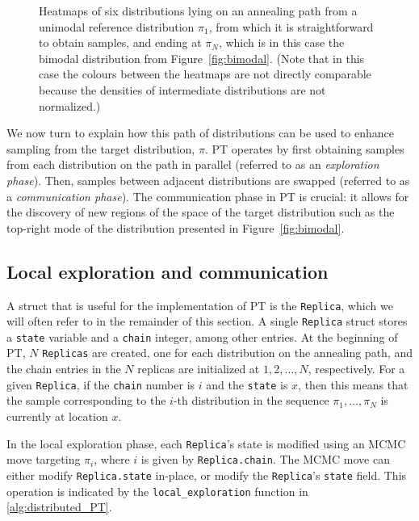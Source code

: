 \begin{figure}[t]
\begin{minipage}{0.15\textwidth}
      \caption*{$\pi_6$}
    \end{minipage}
    \caption{Heatmaps of six distributions lying on an annealing path 
    from a unimodal reference distribution  
    $\pi_1$, from which it is straightforward to obtain samples, and ending at 
    $\pi_N$, which is in this case the bimodal distribution from 
    Figure~\ref{fig:bimodal}. (Note that in this case the colours between the heatmaps 
    are not directly comparable because the densities of intermediate distributions 
    are not normalized.)}
    \label{fig:path}
\end{figure}

We now turn to explain how this path of distributions can be used to enhance 
sampling from the target distribution, $\pi$. 
PT operates by first obtaining samples from each distribution on the path in parallel 
(referred to as an \textit{exploration phase}). 
Then, samples between adjacent distributions are swapped (referred to as 
a \textit{communication phase}). The communication phase in PT is crucial: it allows 
for the discovery of new regions of the space of the target distribution such as 
the top-right mode of the distribution presented in Figure~\ref{fig:bimodal}. 


\subsection{Local exploration and communication}
A struct that is useful for the implementation of PT is the \texttt{Replica}, 
which we will often refer to in the remainder of this section. 
A single \texttt{Replica} struct stores a \texttt{state} variable and a \texttt{chain} 
integer, among other entries. 
At the beginning of PT, $N$ \texttt{Replicas} are created, 
one for each distribution on the annealing path, and 
the chain entries in the $N$ replicas are initialized at $1,2,\ldots,N$, respectively. 
For a given \texttt{Replica}, if the \texttt{chain} number is $i$ and the \texttt{state}
is $x$, then this means that the sample corresponding to the $i$-th distribution in 
the sequence $\pi_1, \ldots, \pi_N$ is currently at location $x$.  

\medskip 
In the local exploration phase,
each \texttt{Replica}'s state is modified using an MCMC move targeting $\pi_i$,
where $i$ is given by \texttt{Replica.chain}.
The MCMC move can either modify \texttt{Replica.state} in-place, or modify the 
\texttt{Replica}'s \texttt{state} field. 
This operation is indicated by the \texttt{local\_exploration} function in 
\cref{alg:distributed_PT}.

